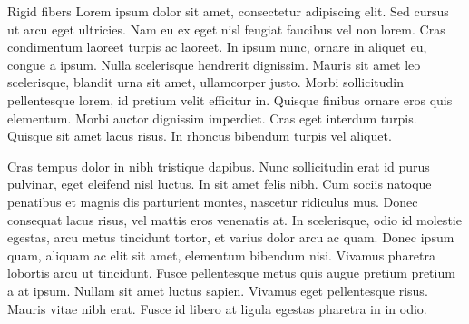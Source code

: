 \documentclass[a4paper,11pt]{kth-mag}
\begin{document}

Rigid fibers Lorem ipsum dolor sit amet, consectetur adipiscing elit. Sed cursus ut arcu eget ultricies. Nam eu ex eget nisl feugiat faucibus vel non lorem. Cras condimentum laoreet turpis ac laoreet. In ipsum nunc, ornare in aliquet eu, congue a ipsum. Nulla scelerisque hendrerit dignissim. Mauris sit amet leo scelerisque, blandit urna sit amet, ullamcorper justo. Morbi sollicitudin pellentesque lorem, id pretium velit efficitur in. Quisque finibus ornare eros quis elementum. Morbi auctor dignissim imperdiet. Cras eget interdum turpis. Quisque sit amet lacus risus. In rhoncus bibendum turpis vel aliquet.

Cras tempus dolor in nibh tristique dapibus. Nunc sollicitudin erat id purus pulvinar, eget eleifend nisl luctus. In sit amet felis nibh. Cum sociis natoque penatibus et magnis dis parturient montes, nascetur ridiculus mus. Donec consequat lacus risus, vel mattis eros venenatis at. In scelerisque, odio id molestie egestas, arcu metus tincidunt tortor, et varius dolor arcu ac quam. Donec ipsum quam, aliquam ac elit sit amet, elementum bibendum nisi. Vivamus pharetra lobortis arcu ut tincidunt. Fusce pellentesque metus quis augue pretium pretium a at ipsum. Nullam sit amet luctus sapien. Vivamus eget pellentesque risus. Mauris vitae nibh erat. Fusce id libero at ligula egestas pharetra in in odio.
\end{document}
